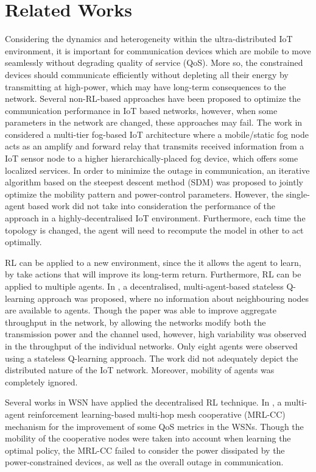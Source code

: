 \documentclass[journal]{IEEEtran}
\begin{document}
\section{Related Works}
Considering the dynamics and heterogeneity within the ultra-distributed IoT environment, it is important for communication devices which are mobile to move seamlessly without degrading quality of service (QoS). More so, the constrained devices should communicate efficiently without depleting all their energy by transmitting at high-power, which may have long-term consequences to the network. Several non-RL-based approaches have been proposed to optimize the communication performance in IoT based networks, however, when some parameters in the network are changed, these approaches may fail.
The work in~\cite{OmoniwaRelay2018} considered a multi-tier fog-based IoT architecture where a mobile/static fog node acts as an amplify and forward relay that transmits received information from a IoT sensor node to a higher hierarchically-placed fog device, which offers some localized services. In order to minimize the outage in communication, an iterative algorithm based on the steepest descent method (SDM) was proposed to jointly optimize the mobility pattern and power-control parameters. However, the single-agent based work did not take into consideration the performance of the approach in a highly-decentralised IoT environment. Furthermore, each time the topology is changed, the agent will need to recompute the model in other to act optimally.

RL can be applied to a new environment, since the it allows the agent to learn, by take actions that will improve its long-term return. Furthermore, RL can be applied to multiple agents. In \cite{Wilhelmi2017}, a decentralised, multi-agent-based stateless Q-learning approach was proposed, where no information about neighbouring nodes are available to agents. Though the paper was able to improve aggregate throughput in the network, by allowing the networks modify both the transmission power and the channel used, however, high variability was observed in the throughput of the individual networks. Only eight agents were observed using a stateless Q-learning approach. The work did not adequately depict the distributed nature of the IoT network. Moreover, mobility of agents was completely ignored.

Several works in WSN have applied the decentralised RL technique. In \cite{Liang2009}, a multi-agent reinforcement learning-based multi-hop mesh cooperative (MRL-CC) mechanism for the improvement of some QoS metrics in the WSNs. Though the mobility of the cooperative nodes were taken into account when learning the optimal policy, the MRL-CC failed to consider the power dissipated by the power-constrained devices, as well as the overall outage in communication.
\end{document}
